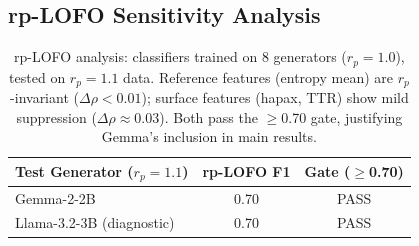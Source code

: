 \documentclass[11pt,a4paper]{article}
\begin{document}
\subsection{rp-LOFO Sensitivity Analysis}

\begin{table}[h]
\centering
\small
\begin{tabular}{lcc}
\toprule
\textbf{Test Generator ($r_p = 1.1$)} & \textbf{rp-LOFO F1} & \textbf{Gate ($\geq$0.70)} \\
\midrule
Gemma-2-2B   & 0.70 & PASS \\
Llama-3.2-3B (diagnostic) & 0.70 & PASS \\
\bottomrule
\end{tabular}
\caption{rp-LOFO analysis: classifiers trained on 8 generators ($r_p = 1.0$), tested on $r_p = 1.1$ data. Reference features (entropy mean) are $r_p$-invariant ($\Delta\rho < 0.01$); surface features (hapax, TTR) show mild suppression ($\Delta\rho \approx 0.03$). Both pass the $\geq$0.70 gate, justifying Gemma's inclusion in main results.}
\label{tab:rplofo}
\end{table}
\end{document}
